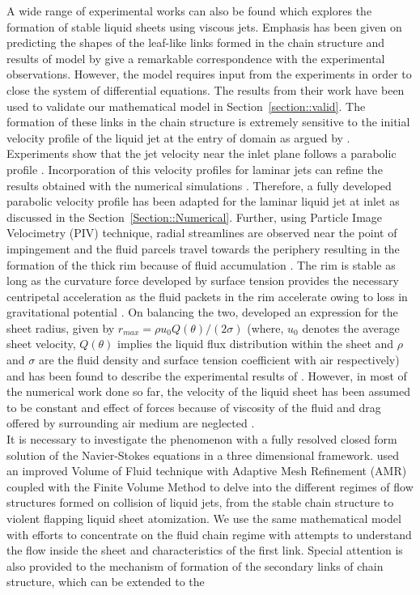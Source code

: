 \documentclass[%
aip,
sd,%
amsmath,amssymb,
preprint,%
author-year,%
]{revtex4-1}
\begin{document}
A wide range of experimental works can also be found which explores the formation of stable liquid sheets using viscous jets. Emphasis has been given on predicting the shapes of the leaf-like links formed in the chain structure and results of model by \cite{bush2004collision} give a remarkable correspondence with the experimental observations. However, the model requires input from the experiments in order to close the system of differential equations. The results from their work have been used to validate our mathematical model in Section~\ref{section::valid}. The formation of these links in the chain structure is extremely sensitive to the initial velocity profile of the liquid jet at the entry of domain as argued by \cite{choo2002velocity,choo2007effect,inamura2014effect}. Experiments show that the jet velocity near the inlet plane follows a parabolic profile \citep{choo2002velocity}. Incorporation of this velocity profiles for laminar jets can refine the results obtained  with the numerical simulations \citep{chen2013high}. Therefore, a fully developed parabolic velocity profile has been adapted for the laminar liquid jet at inlet as discussed in the Section~\ref{Section::Numerical}. Further, using Particle Image Velocimetry (PIV) technique, radial streamlines are observed near the point of impingement and the fluid parcels travel towards the periphery resulting in the formation of the thick rim because of fluid accumulation \citep{choo2002velocity,bush2004collision}. The rim is stable as long as the curvature force developed by surface tension provides the necessary centripetal acceleration as the fluid packets in the rim accelerate owing to loss in gravitational potential \citep{bremond2006atomization}. On balancing the two, \cite{taylor1960formation} developed an expression for the sheet radius, given by $r_{max} = \rho u_0 Q(\theta)/(2\sigma)$ (where, $u_0$ denotes the average sheet velocity, $Q(\theta)$ implies the liquid flux distribution within the sheet and $\rho$ and $\sigma$ are the fluid density and surface tension coefficient with air respectively) and has been found to describe the experimental results of \cite{bush2004collision}.  However, in most of the numerical work done so far, the velocity of the liquid sheet has been assumed to be constant and effect of forces because of viscosity of the fluid and drag offered by surrounding air medium are neglected \citep{taylor1960formation,hureau1998impinging,bush2004collision}.\\ It is necessary to investigate the phenomenon with a fully resolved closed form solution of the Navier-Stokes equations in a three dimensional framework. \cite{chen2013high} used an improved Volume of Fluid technique with Adaptive Mesh Refinement (AMR) coupled with the Finite Volume Method to delve into the different regimes of flow structures formed on collision of liquid jets, from the stable chain structure to violent flapping liquid sheet atomization. We use the same mathematical model with efforts to concentrate on the fluid chain regime with attempts to understand the flow inside the sheet and characteristics of the first link. Special attention is also provided to the mechanism of formation of the secondary links of chain structure, which can be extended to the 
\end{document}
